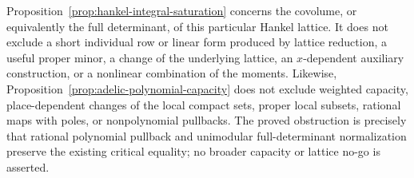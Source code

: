 \begin{remark}
Proposition~\ref{prop:hankel-integral-saturation} concerns the covolume, or
equivalently the full determinant, of this particular Hankel lattice.
It does not exclude a short individual row or linear form produced by
lattice reduction, a useful proper minor, a change of the underlying
lattice, an \(x\)-dependent auxiliary construction, or a nonlinear
combination of the moments.  Likewise,
Proposition~\ref{prop:adelic-polynomial-capacity} does not exclude weighted
capacity, place-dependent changes of the local compact sets, proper local
subsets, rational maps with poles, or nonpolynomial pullbacks.  The proved
obstruction is precisely that rational polynomial pullback and unimodular
full-determinant normalization preserve the existing critical equality;
no broader capacity or lattice no-go is asserted.
\end{remark}
